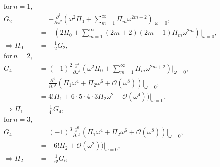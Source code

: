 \documentclass{article}
\numberwithin{equation}{section} %
\begin{document}
\begin{align}
\mathrm{for}\, n=1,&\nonumber\\
G_2 &= -\frac{\partial^{2}}{\partial \omega^{2}} (\omega^2 \Pi_0 + \sum_{m=1}^\infty \Pi_m \omega^{2m+2})\bigg \vert_{\omega=0} ,\nonumber\\
&= -(2\Pi_0 + \sum_{m=1}^\infty (2m+2)(2m+1)\Pi_m \omega^{2m})\bigg \vert_{\omega=0} ,\nonumber\\
\Rightarrow \Pi_0 &= -\frac{1}{2}G_2,\nonumber\\
\mathrm{for}\, n=2,&\nonumber\\
G_4 &= (-1)^2\frac{\partial^{4}}{\partial \omega^{4}} (\omega^2 \Pi_0 + \sum_{m=1}^\infty \Pi_m \omega^{2m+2})\bigg \vert_{\omega=0} ,\nonumber\\
&=  \frac{\partial^{4}}{\partial \omega^{4}}(\Pi_1 \omega^{4} + \Pi_2 \omega^{6} + \mathcal{O}(\omega^8))\bigg \vert_{\omega=0} ,\nonumber\\
&= 4!\Pi_1 + 6\cdot 5\cdot 4\cdot 3\Pi_2 \omega^{2} + \mathcal{O}(\omega^4))\bigg \vert_{\omega=0} ,\nonumber\\
\Rightarrow \Pi_1 &= \frac{1}{4!}G_4,\nonumber\\
\mathrm{for}\, n=3,&\nonumber\\
G_4 &= (-1)^3\frac{\partial^{6}}{\partial \omega^{6}} (\Pi_1 \omega^{4} + \Pi_2 \omega^{6} + \mathcal{O}(\omega^8))\bigg \vert_{\omega=0} ,\nonumber\\
&=-6!\Pi_2 + \mathcal{O}(\omega^2))\bigg \vert_{\omega=0} ,\nonumber\\
\Rightarrow \Pi_2 &= -\frac{1}{6!}G_6
\label{pi0g2}
\end{align}
\end{document}
